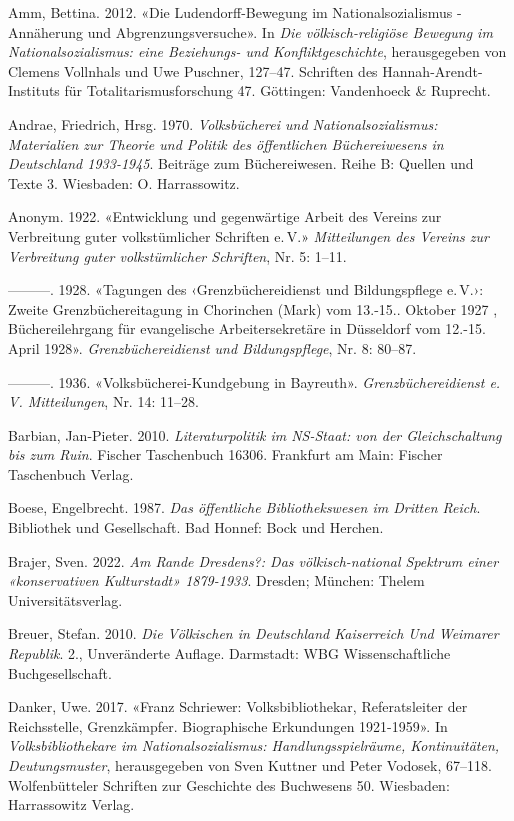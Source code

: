 \documentclass[a4paper,
fontsize=11pt,
oneside,
numbers=noperiodatend,
parskip=half-,
bibliography=totoc,
final
]{scrartcl}
\begin{document}
Amm, Bettina. 2012. «Die Ludendorff-Bewegung im Nationalsozialismus -
Annäherung und Abgrenzungsversuche». In \emph{Die völkisch-religiöse
Bewegung im Nationalsozialismus: eine Beziehungs- und
Konfliktgeschichte}, herausgegeben von Clemens Vollnhals und Uwe
Puschner, 127--47. Schriften des Hannah-Arendt-Instituts für
Totalitarismusforschung 47. Göttingen: Vandenhoeck \& Ruprecht.

Andrae, Friedrich, Hrsg. 1970. \emph{Volksbücherei und
Nationalsozialismus: Materialien zur Theorie und Politik des
öffentlichen Büchereiwesens in Deutschland 1933-1945}. Beiträge zum
Büchereiwesen. Reihe B: Quellen und Texte 3. Wiesbaden: O. Harrassowitz.

Anonym. 1922. «Entwicklung und gegenwärtige Arbeit des Vereins zur
Verbreitung guter volkstümlicher Schriften e.\,V.» \emph{Mitteilungen des
Vereins zur Verbreitung guter volkstümlicher Schriften}, Nr. 5: 1--11.

---------. 1928. «Tagungen des ‹Grenzbüchereidienst und Bildungspflege
e.\,V.›: Zweite Grenzbüchereitagung in Chorinchen (Mark) vom 13.-15..
Oktober 1927 , Büchereilehrgang für evangelische Arbeitersekretäre in
Düsseldorf vom 12.-15. April 1928». \emph{Grenzbüchereidienst und
Bildungspflege}, Nr. 8: 80--87.

---------. 1936. «Volksbücherei-Kundgebung in Bayreuth».
\emph{Grenzbüchereidienst e.\,V. Mitteilungen}, Nr. 14: 11--28.

Barbian, Jan-Pieter. 2010. \emph{Literaturpolitik im NS-Staat: von der
Gleichschaltung bis zum Ruin}. Fischer Taschenbuch 16306. Frankfurt am
Main: Fischer Taschenbuch Verlag.

Boese, Engelbrecht. 1987. \emph{Das öffentliche Bibliothekswesen im
Dritten Reich}. Bibliothek und Gesellschaft. Bad Honnef: Bock und
Herchen.

Brajer, Sven. 2022. \emph{Am Rande Dresdens?: Das völkisch-national
Spektrum einer «konservativen Kulturstadt» 1879-1933}. Dresden; München:
Thelem Universitätsverlag.

Breuer, Stefan. 2010. \emph{Die Völkischen in Deutschland Kaiserreich
Und Weimarer Republik}. 2., Unveränderte Auflage. Darmstadt: WBG
Wissenschaftliche Buchgesellschaft.

Danker, Uwe. 2017. «Franz Schriewer: Volksbibliothekar, Referatsleiter
der Reichsstelle, Grenzkämpfer. Biographische Erkundungen 1921-1959». In
\emph{Volksbibliothekare im Nationalsozialismus: Handlungsspielräume,
Kontinuitäten, Deutungsmuster}, herausgegeben von Sven Kuttner und Peter
Vodosek, 67--118. Wolfenbütteler Schriften zur Geschichte des Buchwesens
50. Wiesbaden: Harrassowitz Verlag.
\end{document}

